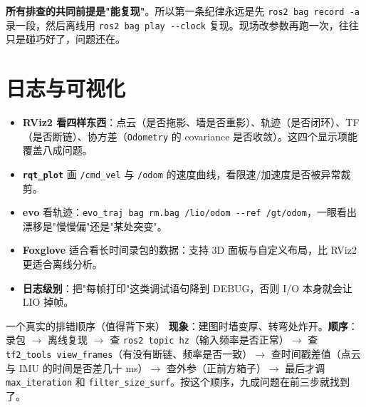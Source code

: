 \begin{note}
\textbf{所有排查的共同前提是"能复现"}。所以第一条纪律永远是先 \lstinline{ros2 bag record -a} 录一段，然后离线用 \lstinline{ros2 bag play --clock} 复现。现场改参数再跑一次，往往只是碰巧好了，问题还在。
\end{note}

\section{日志与可视化}\label{sec:27-vis}

\begin{itemize}
  \item \textbf{RViz2 看四样东西}：点云（是否拖影、墙是否重影）、轨迹（是否闭环）、TF（是否断链）、协方差（\lstinline{Odometry} 的 covariance 是否收敛）。这四个显示项能覆盖八成问题。
  \item \textbf{\lstinline{rqt_plot}} 画 \lstinline{/cmd_vel} 与 \lstinline{/odom} 的速度曲线，看限速/加速度是否被异常裁剪。
  \item \textbf{evo} 看轨迹：\lstinline{evo_traj bag rm.bag /lio/odom --ref /gt/odom}，一眼看出漂移是"慢慢偏"还是"某处突变"。
  \item \textbf{Foxglove} 适合看长时间录包的数据：支持 3D 面板与自定义布局，比 RViz2 更适合离线分析。
  \item \textbf{日志级别}：把"每帧打印"这类调试语句降到 DEBUG，否则 I/O 本身就会让 LIO 掉帧。
\end{itemize}

\begin{keybox}{一个真实的排错顺序（值得背下来）}
\textbf{现象}：建图时墙变厚、转弯处炸开。\textbf{顺序}：录包 $\to$ 离线复现 $\to$ 查 \lstinline{ros2 topic hz}（输入频率是否正常）$\to$ 查 \lstinline{tf2_tools view_frames}（有没有断链、频率是否一致）$\to$ 查时间戳差值（点云与 IMU 的时间是否差几十 ms）$\to$ 查外参（正前方箱子）$\to$ 最后才调 \lstinline{max_iteration} 和 \lstinline{filter_size_surf}。按这个顺序，九成问题在前三步就找到了。
\end{keybox}

